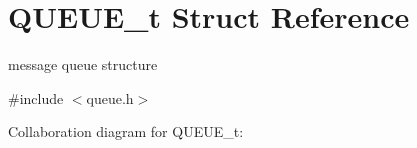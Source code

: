 \hypertarget{structQUEUE__t}{}\section{Q\+U\+E\+U\+E\+\_\+t Struct Reference}
\label{structQUEUE__t}


message queue structure  




{\ttfamily \#include $<$queue.\+h$>$}



Collaboration diagram for Q\+U\+E\+U\+E\+\_\+t\+:
